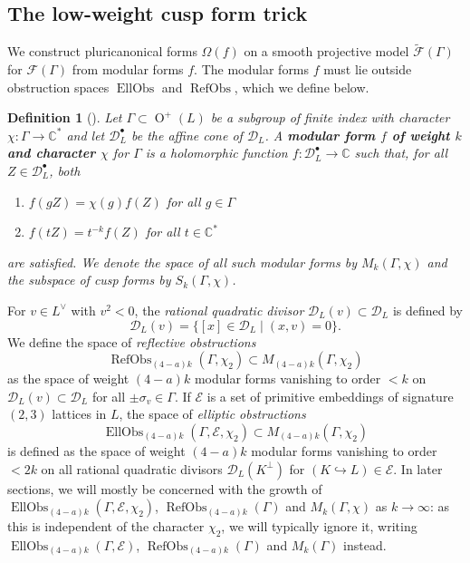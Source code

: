 \documentclass[12pt, a4paper]{article}
\newtheorem{defn}[thm]{Definition}
\newcommand{\CC}{\mathbb{C}}
\newcommand{\dc}{\mathcal{D}}
\newcommand{\ec}{\mathcal{E}}
\newcommand{\fc}{\mathcal{F}}
\newcommand{\opn}{\operatorname}
\begin{document}
\subsection{The low-weight cusp form trick}
We construct pluricanonical forms $\Omega(f)$ on a smooth projective model $\widetilde{\fc}(\Gamma)$ for $\fc(\Gamma)$ from modular forms $f$.
The modular forms $f$ must lie outside obstruction spaces $\opn{EllObs}$ and  $\opn{RefObs}$, which we define below.
\begin{defn}[{\hspace{1sp}\cite[p.495]{Handbook}}]
  Let $\Gamma \subset \opn{O}^+(L)$ be a subgroup of finite index with character $\chi:\Gamma \rightarrow \CC^*$ and let  $\dc_L^{\bullet}$ be the affine cone of $\dc_L$.
  A \textbf{modular form $f$ of weight $k$ and character $\chi$} for $\Gamma$ is a holomorphic function $f:\dc_L^{\bullet} \rightarrow \CC$ such that, for all $Z \in \dc_L^{\bullet}$, both
  \begin{enumerate}
  \item $f(gZ) = \chi(g) f(Z)$ for all $g \in \Gamma$ 
  \item $f(tZ) = t^{-k} f(Z)$ for all $t \in \CC^*$
  \end{enumerate}
  are satisfied. 
  We denote the space of all such modular forms by $M_k(\Gamma, \chi)$ and the subspace of cusp forms by $S_k(\Gamma, \chi)$.
\end{defn}
For $v \in L^{\vee}$ with $v^2<0$, the \emph{rational quadratic divisor} $\dc_L(v) \subset \dc_L$ is defined by
\[
  \dc_L(v) = \{[x] \in \dc_L \mid (x, v)=0 \}.
  \]
We define the space of \emph{reflective obstructions}
\begin{equation}\label{RefObsdef}
\opn{RefObs}_{(4-a)k}(\Gamma, \chi_2) \subset M_{(4-a)k}(\Gamma, \chi_2)
\end{equation}
as the space of weight $(4-a)k$ modular forms vanishing to order $<k$ on $\dc_L(v) \subset \dc_L$ for all $\pm \sigma_v \in \Gamma$.
If $\ec$ is a set of primitive embeddings of signature $(2,3)$ lattices in $L$, the space of \emph{elliptic obstructions} 
\begin{equation}\label{EllObsdef}
\opn{EllObs}_{(4-a)k}(\Gamma, \ec, \chi_2) \subset M_{(4-a)k}(\Gamma, \chi_2)
\end{equation}
is defined as the space of weight $(4-a)k$ modular forms vanishing to order $<2k$ on all rational quadratic divisors $\dc_L(K^{\perp})$ for $(K \hookrightarrow L) \in \ec$.
In later sections, we will mostly be concerned with the growth of  $\opn{EllObs}_{(4-a)k}(\Gamma, \ec, \chi_2)$, $\opn{RefObs}_{(4-a)k}(\Gamma)$ and $M_k(\Gamma, \chi)$ as $k \rightarrow \infty$: as this is independent of the character $\chi_2$, we will typically ignore it, writing $\opn{EllObs}_{(4-a)k}(\Gamma, \ec)$, $\opn{RefObs}_{(4-a)k}(\Gamma)$ and $M_k(\Gamma)$ instead.
\end{document}
